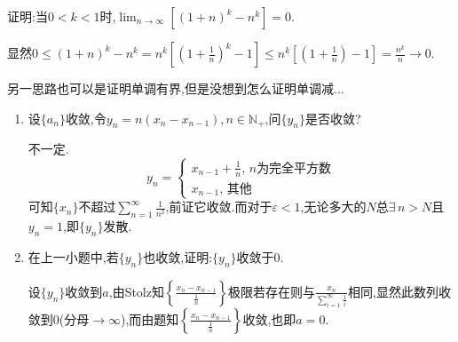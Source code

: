      \begin{exercise}
         证明:当$0<k<1$时,$\lim _{n\to\infty} \left[(1+n)^k-n^k\right]=0$.
     \end{exercise}
     \begin{solution}
         显然$0\leqslant(1+n)^k-n^k=n^k\left[(1+\frac{1}{n})^k-1\right]\leqslant n^k\left[(1+\frac{1}{n})-1\right]=\frac{n^k}{n}\to0$.
     \end{solution}
     \begin{note}
         另一思路也可以是证明单调有界,但是没想到怎么证明单调减...
     \end{note}

     \begin{exercise}

     \end{exercise}
     \begin{enumerate}
         \item 设$\{a_n\}$收敛,令$y_n=n(x_n-x_{n-1}),n\in \mathbb{N}_+$,问$\{y_n\}$是否收敛?
               \begin{solution}
                   不一定.
                   \[
                       y_n=
                       \begin{cases}
                           x_{n-1}+\frac{1}{n}, \, n\text{为完全平方数} \\
                           x_{n-1}, \, \text{其他}
                       \end{cases}
                   \]
                   可知$\{x_n\}$不超过$\sum_{n = 1}^{\infty}\frac{1}{n^2} $,前证它收敛.而对于$\varepsilon<1$,无论多大的$N$总$\exists\, n>N$且$y_n=1$,即$\{y_n\}$发散.
               \end{solution}

         \item 在上一小题中,若$\{y_n\}$也收敛,证明:$\{y_n\}$收敛于0.
               \begin{solution}
                   设$\{y_n\}$收敛到$a$,由Stolz知$\left\{\frac{x_n-x_{n-1}}{\frac{1}{n}}\right\}$极限若存在则与$\frac{x_n}{\sum_{i=1}^\infty\frac{1}{i}}$相同,显然此数列收敛到0(分母$\to\infty$),而由题知$\left\{\frac{x_n-x_{n-1}}{\frac{1}{n}}\right\}$收敛,也即$a=0$.
               \end{solution}
     \end{enumerate}

